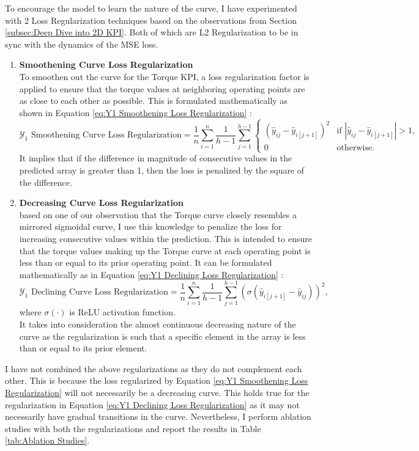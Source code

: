 \documentclass{report} %
\begin{document}
To encourage the model to learn the nature of the curve, I have experimented with 2 Loss Regularization techniques based on the observations from Section 
\ref{subsec:Deep Dive into 2D KPI}. 
Both of which are L2 Regularization to be in sync with the dynamics of the \ac{MSE} loss.
\begin{enumerate}
\item \textbf{Smoothening Curve Loss Regularization} \\
To smoothen out the curve for the Torque \ac{KPI}, a loss regularization factor is applied to ensure that the torque values at neighboring operating points are 
as close to each other as possible. This is formulated mathematically as shown in Equation \ref{eq:Y1 Smoothening Loss Regularization} :
\begin{equation}
    \text{$\mathcal{Y}_1$ Smoothening Curve Loss Regularization} = \frac{1}{n} \sum_{i=1}^{n} \frac{1}{h-1} \sum_{j=1}^{h-1}
    \begin{cases} 
        \left( \hat{y}_{ij} - \hat{y}_{i[j+1]}  \right)^2 & \text{if } |\hat{y}_{ij} - \hat{y}_{i[j+1]}| > 1, \\
        0 & \text{otherwise}.
    \end{cases}
    \label{eq:Y1 Smoothening Loss Regularization}
\end{equation}
It implies that if the difference in magnitude of consecutive values in the predicted array is greater than 1, then the loss is penalized by the square of the difference.
\item \textbf{Decreasing Curve Loss Regularization} \\
based on one of our observation that the Torque curve closely resembles a mirrored sigmoidal curve, I use this knowledge to penalize the loss for increasing consecutive 
values within the prediction. This is intended to ensure that the torque values making up the Torque curve at each operating point is less than or equal to its prior operating point.
It can be formulated mathematically as in Equation \ref{eq:Y1 Declining Loss Regularization} :
\begin{equation}
    \text{$\mathcal{Y}_1$ Declining Curve Loss Regularization} = \frac{1}{n} \sum_{i=1}^{n}\frac{1}{h-1} \sum_{j=1}^{h-1} \left(\sigma(\hat{y}_{i[j+1]} - \hat{y}_{ij})\right)^2,
    \label{eq:Y1 Declining Loss Regularization}
\end{equation} 
where $\sigma(\cdot)$ is \ac{ReLU} activation function.\\
It takes into consideration the almost continuous decreasing nature of the curve as the regularization is such that a specific element in the array is less than or 
equal to its prior element.

\end{enumerate}
I have not combined the above regularizations as they do not complement each other. This is because the loss regularized by Equation 
\ref{eq:Y1 Smoothening Loss Regularization} will not necessarily be a decreasing curve.
This holds true for the regularization in Equation \ref{eq:Y1 Declining Loss Regularization} as it may not necessarily have gradual transitions in the curve.
Nevertheless, I perform ablation studies with both the regularizations and report the results in Table \ref{tab:Ablation Studies}.
\end{document}
